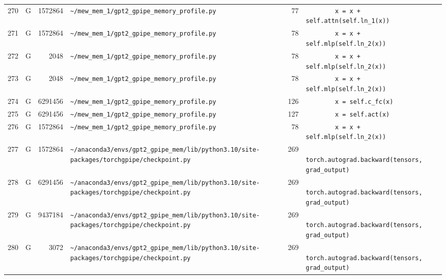 \documentclass{article}
\begin{document}
\begin{longtable}{r l r p{6.5cm} r p{7.0cm}}
270 & G & 1572864 & \lstinline|~/mew_mem_1/gpt2_gpipe_memory_profile.py| & 77 & \lstinline|        x = x + self.attn(self.ln_1(x))| \\
271 & G & 1572864 & \lstinline|~/mew_mem_1/gpt2_gpipe_memory_profile.py| & 78 & \lstinline|        x = x + self.mlp(self.ln_2(x))| \\
272 & G & 2048 & \lstinline|~/mew_mem_1/gpt2_gpipe_memory_profile.py| & 78 & \lstinline|        x = x + self.mlp(self.ln_2(x))| \\
273 & G & 2048 & \lstinline|~/mew_mem_1/gpt2_gpipe_memory_profile.py| & 78 & \lstinline|        x = x + self.mlp(self.ln_2(x))| \\
274 & G & 6291456 & \lstinline|~/mew_mem_1/gpt2_gpipe_memory_profile.py| & 126 & \lstinline|        x = self.c_fc(x)| \\
275 & G & 6291456 & \lstinline|~/mew_mem_1/gpt2_gpipe_memory_profile.py| & 127 & \lstinline|        x = self.act(x)| \\
276 & G & 1572864 & \lstinline|~/mew_mem_1/gpt2_gpipe_memory_profile.py| & 78 & \lstinline|        x = x + self.mlp(self.ln_2(x))| \\
277 & G & 1572864 & \lstinline|~/anaconda3/envs/gpt2_gpipe_mem/lib/python3.10/site-packages/torchgpipe/checkpoint.py| & 269 & \lstinline|            torch.autograd.backward(tensors, grad_output)| \\
278 & G & 6291456 & \lstinline|~/anaconda3/envs/gpt2_gpipe_mem/lib/python3.10/site-packages/torchgpipe/checkpoint.py| & 269 & \lstinline|            torch.autograd.backward(tensors, grad_output)| \\
279 & G & 9437184 & \lstinline|~/anaconda3/envs/gpt2_gpipe_mem/lib/python3.10/site-packages/torchgpipe/checkpoint.py| & 269 & \lstinline|            torch.autograd.backward(tensors, grad_output)| \\
280 & G & 3072 & \lstinline|~/anaconda3/envs/gpt2_gpipe_mem/lib/python3.10/site-packages/torchgpipe/checkpoint.py| & 269 & \lstinline|            torch.autograd.backward(tensors, grad_output)| \\
\end{longtable}
\end{document}
